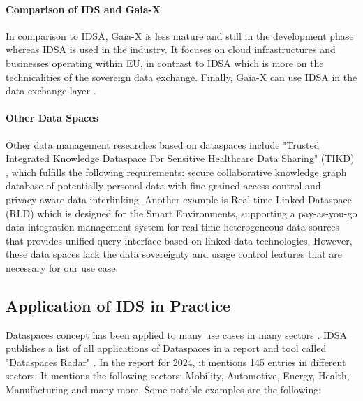 \paragraph{Comparison of IDS and Gaia-X}




In comparison to IDSA, Gaia-X is less mature and still in the development phase whereas IDSA is used in the industry\cite{otto_prof_dr_boris_gaia-x_2021}.
It focuses on cloud infrastructures and businesses operating within EU, in contrast to IDSA which is more on the technicalities of the sovereign data exchange\cite{otto_prof_dr_boris_gaia-x_2021}.
Finally, Gaia-X can use IDSA in the data exchange layer \cite{otto_prof_dr_boris_gaia-x_2021}. 

\paragraph{Other Data Spaces}
Other data management researches based on dataspaces include "Trusted Integrated Knowledge Dataspace For Sensitive Healthcare Data Sharing" (TIKD)  \cite{hernandez_tikd_2021}, which fulfills the following requirements: secure collaborative knowledge graph database of potentially personal data with fine grained access control and privacy-aware data interlinking.
Another example is Real-time Linked Dataspace (RLD) \cite{curry_real-time_2019} which is designed for the Smart Environments, supporting a pay-as-you-go data integration management system for real-time heterogeneous data sources that provides unified query interface based on linked data technologies.
However, these data spaces lack the data sovereignty and usage control features that are necessary for our use case.

\subsection{Application of IDS in Practice}
Dataspaces concept has been applied to many use cases in many sectors \cite{dataspace_radar}. IDSA publishes a list of all applications of Dataspaces in a report and tool called "Dataspaces Radar" \cite{dataspace_radar}. In the report for 2024, it mentions 145 entries in different sectors. It mentions the following sectors: Mobility, Automotive, Energy, Health, Manufacturing and many more.
Some notable examples are the following:

